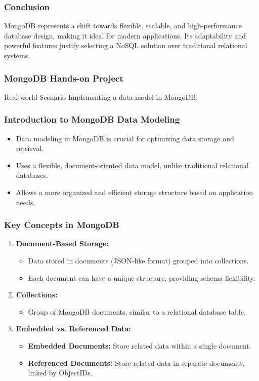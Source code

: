 \documentclass[aspectratio=169]{beamer}
\begin{document}
\begin{frame}[fragile]
    \frametitle{Conclusion}
    MongoDB represents a shift towards flexible, scalable, and high-performance database design, making it ideal for modern applications. Its adaptability and powerful features justify selecting a NoSQL solution over traditional relational systems.
\end{frame}

\begin{frame}
    \frametitle{MongoDB Hands-on Project}
    \begin{block}{Real-world Scenario}
        Implementing a data model in MongoDB.
    \end{block}
\end{frame}

\begin{frame}[fragile]
    \frametitle{Introduction to MongoDB Data Modeling}
    \begin{itemize}
        \item Data modeling in MongoDB is crucial for optimizing data storage and retrieval.
        \item Uses a flexible, document-oriented data model, unlike traditional relational databases.
        \item Allows a more organized and efficient storage structure based on application needs.
    \end{itemize}
\end{frame}

\begin{frame}[fragile]
    \frametitle{Key Concepts in MongoDB}
    \begin{enumerate}
        \item \textbf{Document-Based Storage:}
            \begin{itemize}
                \item Data stored in documents (JSON-like format) grouped into collections.
                \item Each document can have a unique structure, providing schema flexibility.
            \end{itemize}
        \item \textbf{Collections:}
            \begin{itemize}
                \item Group of MongoDB documents, similar to a relational database table.
            \end{itemize}
        \item \textbf{Embedded vs. Referenced Data:}
            \begin{itemize}
                \item \textbf{Embedded Documents:} Store related data within a single document.
                \item \textbf{Referenced Documents:} Store related data in separate documents, linked by ObjectIDs.
            \end{itemize}
    \end{enumerate}
\end{frame}
\end{document}
